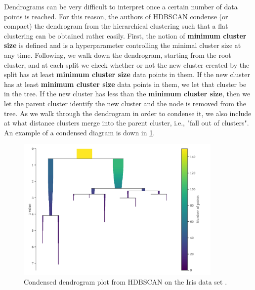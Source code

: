Dendrograms can be very difficult to interpret once a certain number of data points is reached. For this reason, the authors of HDBSCAN condense (or compact) the dendrogram from the hierarchical clustering such that a flat clustering can be obtained rather easily. First, the notion of \textbf{minimum cluster size} is defined and is a hyperparameter controlling the minimal cluster size at any time. Following, we walk down the dendrogram, starting from the root cluster, and at each split we check whether or not the new cluster created by the split has at least \textbf{minimum cluster size} data points in them. If the new cluster has at least \textbf{minimum cluster size} data points in them, we let that cluster be in the tree. If the new cluster has less than the \textbf{minimum cluster size}, then we let the parent cluster identify the new cluster and the node is removed from the tree. As we walk through the dendrogram in order to condense it, we also include at what distance clusters merge into the parent cluster, i.e., "fall out of clusters". An example of a condensed diagram is down in \cref{fig:hdbscan-condensed-dendrogram-example}.
\begin{figure}[H]
    \centering
    \includegraphics[width=10cm]{thesis/figures/hdbscan-condensed-tree-example.pdf}
    \caption{Condensed dendrogram plot from HDBSCAN on the Iris data set \cite{Fisher1936}.}
    \label{fig:hdbscan-condensed-dendrogram-example}
\end{figure}

